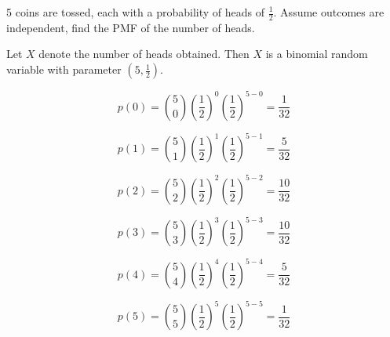\documentclass{article}
\begin{document}
5 coins are tossed, each with a probability of heads of \( \frac{1}{2} \). Assume outcomes are independent, find the PMF of the number of heads.

Let \( X \) denote the number of heads obtained. Then \( X \) is a binomial random variable with parameter \( (5, \frac{1}{2}) \).

\[
p(0) = \binom{5}{0} \left(\frac{1}{2}\right)^0 \left(\frac{1}{2}\right)^{5 - 0} = \frac{1}{32}
\]

\[
p(1) = \binom{5}{1} \left(\frac{1}{2}\right)^1 \left(\frac{1}{2}\right)^{5 - 1} = \frac{5}{32}
\]

\[
p(2) = \binom{5}{2} \left(\frac{1}{2}\right)^2 \left(\frac{1}{2}\right)^{5 - 2} = \frac{10}{32}
\]

\[
p(3) = \binom{5}{3} \left(\frac{1}{2}\right)^3 \left(\frac{1}{2}\right)^{5 - 3} = \frac{10}{32}
\]

\[
p(4) = \binom{5}{4} \left(\frac{1}{2}\right)^4 \left(\frac{1}{2}\right)^{5 - 4} = \frac{5}{32}
\]

\[
p(5) = \binom{5}{5} \left(\frac{1}{2}\right)^5 \left(\frac{1}{2}\right)^{5 - 5} = \frac{1}{32}
\]
\end{document}

